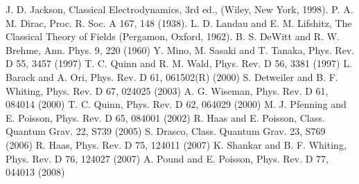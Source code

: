 \documentclass[prd,showpacs,preprint]{revtex4}
\begin{document}

\begin{thebibliography}{}
\label{sec:TeXbooks}
 J. D. Jackson, Classical Electrodynamics, 3rd ed., (Wiley, New York, 1998).
 P. A. M. Dirac, Proc. R. Soc. A 167, 148 (1938).
 L. D. Landau and E. M. Lifshitz, The Classical Theory of Fields (Pergamon, Oxford, 1962).
 B. S. DeWitt and R. W. Brehme, Ann. Phys. 9, 220 (1960)
 Y. Mino, M. Sasaki and T. Tanaka, Phys. Rev. D 55, 3457 (1997)
 T. C. Quinn and R. M. Wald, Phys. Rev. D 56, 3381 (1997)
 L. Barack and A. Ori, Phys. Rev. D 61, 061502(R) (2000)
 S. Detweiler and B. F. Whiting, Phys. Rev. D 67, 024025 (2003)
 A. G. Wiseman, Phys. Rev. D 61, 084014 (2000)
 T. C. Quinn, Phys. Rev. D 62, 064029 (2000)
 M. J. Pfenning and E. Poisson, Phys. Rev. D 65, 084001 (2002)
 R. Haas and E. Poisson, Class. Quantum Grav. 22, S739 (2005)
 S. Drasco, Class. Quantum Grav. 23, S769 (2006)
 R. Haas, Phys. Rev. D 75, 124011 (2007)
 K. Shankar and B. F. Whiting, Phys. Rev. D 76, 124027 (2007)
 A. Pound and E. Poisson, Phys. Rev. D 77, 044013 (2008)
\end{thebibliography}
\end{document}
